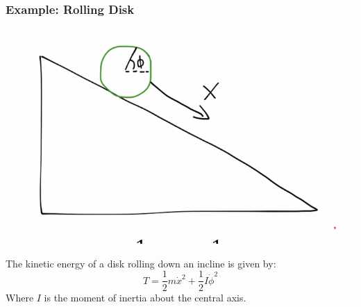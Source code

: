 \subsubsection{Example: Rolling Disk}
\begin{center}
    \includegraphics[scale=0.5]{Lecture-17/l17-img4.png}
\end{center}
The kinetic energy of a disk rolling down an incline is given by:
\[T = \frac{1}{2}m\dot{x}^2 + \frac{1}{2}I\dot{\phi}^2\]
Where $I$ is the moment of inertia about the central axis.


